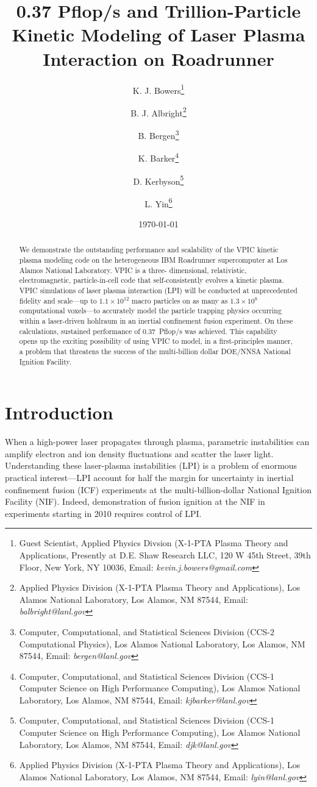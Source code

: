 \documentclass[10pt]{article}
\title{0.37 Pflop/s and Trillion-Particle Kinetic Modeling of Laser Plasma Interaction on Roadrunner}
\author{%
K. J. Bowers\thanks{Guest Scientist, Applied Physics Divsion (X-1-PTA Plasma Theory and Applications, Presently at D.E. Shaw Research LLC, 120 W 45th Street, 39th Floor, New York, NY 10036, Email: \emph{kevin.j.bowers@gmail.com}} \and%
%
B. J. Albright\thanks{Applied Physics Division (X-1-PTA Plasma Theory and Applications), Los Alamos National Laboratory, Los Alamos, NM 87544, Email: \emph{balbright@lanl.gov}} \and%
%
B. Bergen\thanks{Computer, Computational, and Statistical Sciences Division (CCS-2 Computational Physics), Los Alamos National Laboratory, Los Alamos, NM 87544, Email: \emph{bergen@lanl.gov}} \and%
%
K. Barker\thanks{Computer, Computational, and Statistical Sciences Division (CCS-1 Computer Science on High Performance Computing), Los Alamos National Laboratory, Los Alamos, NM 87544, Email: \emph{kjbarker@lanl.gov}} \and%
%
D. Kerbyson\thanks{Computer, Computational, and Statistical Sciences Division (CCS-1 Computer Science on High Performance Computing), Los Alamos National Laboratory, Los Alamos, NM 87544, Email: \emph{djk@lanl.gov}} \and%
%
L. Yin\thanks{Applied Physics Division (X-1-PTA Plasma Theory and Applications), Los Alamos National Laboratory, Los Alamos, NM 87544, Email: \emph{lyin@lanl.gov}}}
\date{\today}
\begin{document}
\maketitle
\thispagestyle{empty}

\begin{singlespace}
\begin{abstract}
We demonstrate the outstanding performance and scalability of the VPIC 
kinetic plasma modeling code on the heterogeneous IBM Roadrunner 
supercomputer at Los Alamos National Laboratory.  VPIC is a three-
dimensional, relativistic, electromagnetic, particle-in-cell code that 
self-consistently evolves a kinetic plasma.  VPIC simulations of laser 
plasma interaction (LPI) will be conducted at unprecedented fidelity 
and scale---up to $1.1 \times 10^{12}$ macro particles on as many as 
$1.3 \times 10^8$ 
computational voxels---to accurately model the particle trapping physics 
occurring within a laser-driven hohlraum in an inertial confinement 
fusion experiment.  On these calculations, sustained performance of 
0.37~Pflop/s was 
achieved.  This capability opens up the exciting possibility of using 
VPIC to model, in a first-principles manner, a problem that threatens 
the success of the multi-billion dollar DOE/NNSA National Ignition Facility.  

\vspace{2in}

\end{abstract}
\end{singlespace}

\pagebreak

\section*{Introduction}

When a high-power laser propagates through plasma, parametric
instabilities can amplify electron and ion density fluctuations and
scatter the laser light.  Understanding these laser-plasma
instabilities (LPI) is a problem of enormous practical interest---LPI
account for half the margin for uncertainty in inertial confinement
fusion (ICF) experiments at the multi-billion-dollar National Ignition
Facility (NIF).  Indeed, demonstration of fusion ignition at the NIF
in experiments starting in 2010 requires control of LPI.
\end{document}
